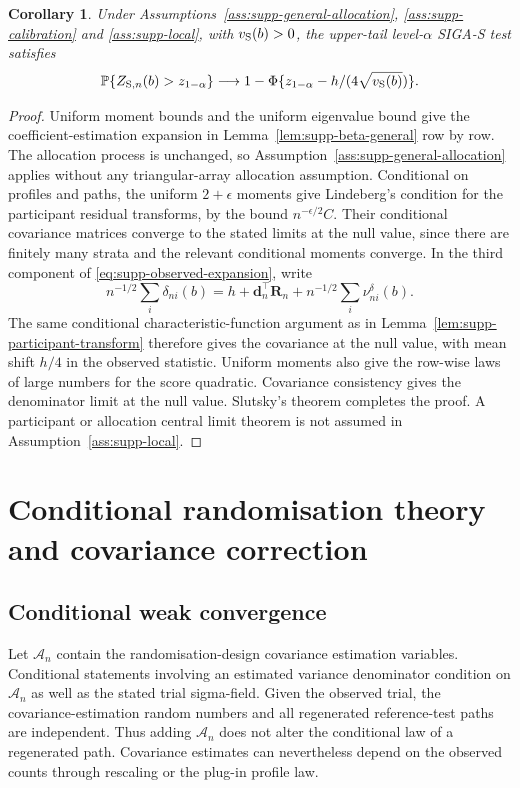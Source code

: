 \documentclass[12pt,a4paper]{article}
\newtheorem{corollary}{Corollary}
\theoremstyle{definition}
\theoremstyle{remark}\newtheorem{remark}{Remark}
\numberwithin{equation}{section}
\newcommand{\Pbb}{\mathbb P}
\begin{document}
\begin{corollary}\label{cor:supp-local-S}
Under Assumptions~\ref{ass:supp-general-allocation}, \ref{ass:supp-calibration} and \ref{ass:supp-local}, with $v_{\rm S}(b)>0$, the upper-tail level-$\alpha$ SIGA-S test satisfies
\[
 \Pbb\{Z_{{\rm S},n}(b)>z_{1-\alpha}\}
 \longrightarrow
 1-\Phi\{z_{1-\alpha}-h/(4\sqrt{v_{\rm S}(b)})\}.
\]
\end{corollary}
\begin{proof}
Uniform moment bounds and the uniform eigenvalue bound give the coefficient-estimation expansion in Lemma~\ref{lem:supp-beta-general} row by row. The allocation process is unchanged, so Assumption~\ref{ass:supp-general-allocation} applies without any triangular-array allocation assumption. Conditional on profiles and paths, the uniform $2+\epsilon$ moments give Lindeberg's condition for the participant residual transforms, by the bound $n^{-\epsilon/2}C$. Their conditional covariance matrices converge to the stated limits at the null value, since there are finitely many strata and the relevant conditional moments converge. In the third component of \eqref{eq:supp-observed-expansion}, write
\[
 n^{-1/2}\sum_i\delta_{ni}(b)
 =h+\bm d_n^\top\bm R_n+n^{-1/2}\sum_i\nu^\delta_{ni}(b).
\]
The same conditional characteristic-function argument as in Lemma~\ref{lem:supp-participant-transform} therefore gives the covariance at the null value, with mean shift $h/4$ in the observed statistic. Uniform moments also give the row-wise laws of large numbers for the score quadratic. Covariance consistency gives the denominator limit at the null value. Slutsky's theorem completes the proof. A participant or allocation central limit theorem is not assumed in Assumption~\ref{ass:supp-local}.
\end{proof}

\section{Conditional randomisation theory and covariance correction}\label{sec:supp-randomization}

\subsection{Conditional weak convergence}
Let $\mathcal A_n$ contain the randomisation-design covariance estimation variables. Conditional statements involving an estimated variance denominator condition on $\mathcal A_n$ as well as the stated trial sigma-field. Given the observed trial, the covariance-estimation random numbers and all regenerated reference-test paths are independent. Thus adding $\mathcal A_n$ does not alter the conditional law of a regenerated path. Covariance estimates can nevertheless depend on the observed counts through rescaling or the plug-in profile law.
\end{document}

